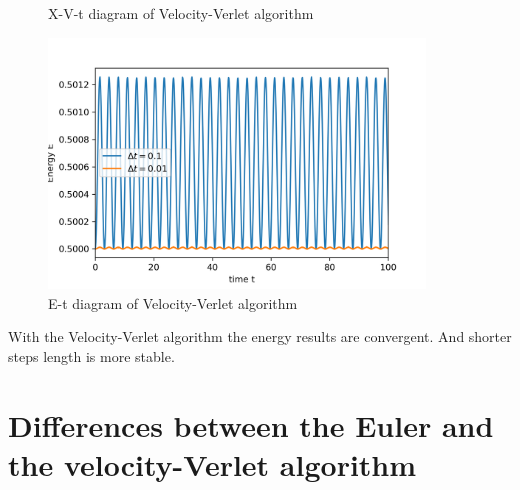 \documentclass[a4paper,12pt]{article}
\begin{document}
\begin{figure}[!htbp]
    \centering

    \caption{X-V-t diagram of Velocity-Verlet algorithm}
    \label{x_v_VV}
\end{figure}

\begin{figure}[!htbp]
    \centering
    \includegraphics[width=10cm]{VV_E.png}

    \caption{E-t diagram of Velocity-Verlet algorithm}
    \label{E_VV}
\end{figure}

With the Velocity-Verlet algorithm the energy results are convergent. And shorter steps length is more stable.

\section{Differences between the Euler and the velocity-Verlet algorithm}
\end{document}
